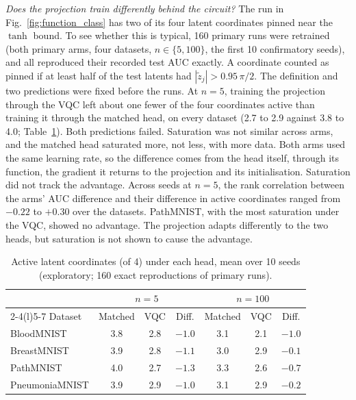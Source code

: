 \documentclass{ieeeaccess}
\newcommand{\vqc}{VQC}
\begin{document}
\emph{Does the projection train differently behind the circuit?} The run in Fig.~\ref{fig:function_class} has two of its four latent coordinates pinned near the $\tanh$ bound. To see whether this is typical, 160 primary runs were retrained (both primary arms, four datasets, $n\in\{5,100\}$, the first 10 confirmatory seeds), and all reproduced their recorded test AUC exactly. A coordinate counted as pinned if at least half of the test latents had $|\tilde z_j|>0.95\,\pi/2$. The definition and two predictions were fixed before the runs. At $n=5$, training the projection through the \vqc{} left about one fewer of the four coordinates active than training it through the matched head, on every dataset (2.7 to 2.9 against 3.8 to 4.0; Table~\ref{tab:e8}). Both predictions failed. Saturation was not similar across arms, and the matched head saturated more, not less, with more data. Both arms used the same learning rate, so the difference comes from the head itself, through its function, the gradient it returns to the projection and its initialisation. Saturation did not track the advantage. Across seeds at $n=5$, the rank correlation between the arms' AUC difference and their difference in active coordinates ranged from $-0.22$ to $+0.30$ over the datasets. PathMNIST, with the most saturation under the \vqc{}, showed no advantage. The projection adapts differently to the two heads, but saturation is not shown to cause the advantage.

\begin{table}[t]
\caption{Active latent coordinates (of 4) under each head, mean over 10 seeds (exploratory; 160 exact reproductions of primary runs).}
\label{tab:e8}
\centering
\setlength{\tabcolsep}{3pt}
\footnotesize
\begin{tabular}{@{}lcccccc@{}}
\toprule
 & \multicolumn{3}{c}{$n=5$} & \multicolumn{3}{c}{$n=100$}\\
\cmidrule(lr){2-4}\cmidrule(l){5-7}
Dataset & Matched & \vqc{} & Diff. & Matched & \vqc{} & Diff.\\
\midrule
BloodMNIST & 3.8 & 2.8 & $-1.0$ & 3.1 & 2.1 & $-1.0$\\
BreastMNIST & 3.9 & 2.8 & $-1.1$ & 3.0 & 2.9 & $-0.1$\\
PathMNIST & 4.0 & 2.7 & $-1.3$ & 3.3 & 2.6 & $-0.7$\\
PneumoniaMNIST & 3.9 & 2.9 & $-1.0$ & 3.1 & 2.9 & $-0.2$\\
\bottomrule
\end{tabular}
\end{table}
\end{document}
